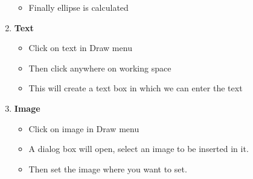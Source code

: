 \begin{enumerate}
\begin{itemize}
\item Finally ellipse is calculated
\end{itemize}
\item \textbf{Text}
\begin{itemize}
\item Click on text in Draw menu
\item Then click anywhere on working space
\item This will create a text box in which we can enter the text
\end{itemize}
\item \textbf{Image}
\begin{itemize}
\item Click on image in Draw menu
\item A dialog box will open, select an image to be inserted in it.
\item Then set the image where you want to set.
\end{itemize}
\end{enumerate}

